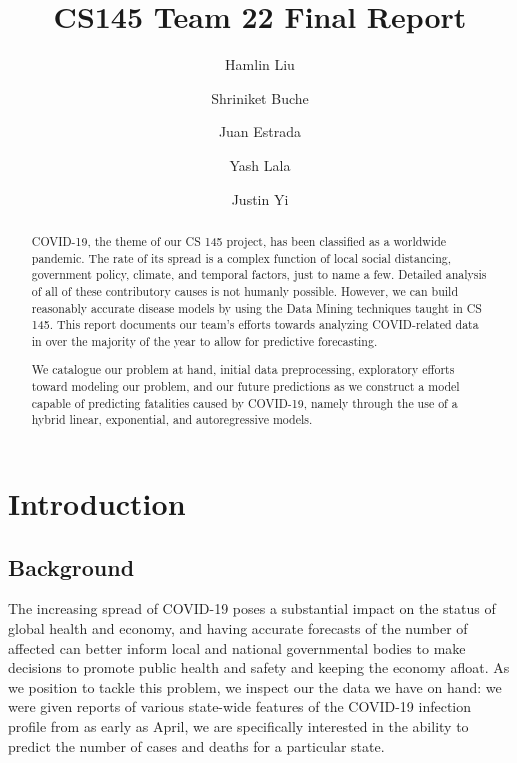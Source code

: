 \documentclass[sigconf,nonacm]{acmart}
\begin{document}
\title{CS145 Team 22 Final Report}

\author{Hamlin Liu}
\author{Shriniket Buche}
\author{Juan Estrada}
\author{Yash Lala}
\author{Justin Yi}
\renewcommand{\shortauthors}{Team 22}

\begin{abstract}

COVID-19, the theme of our CS 145 project, has been classified as a worldwide
pandemic. The rate of its spread is a complex function of local social
distancing, government policy, climate, and temporal factors, just to name a
few. Detailed analysis of all of these contributory causes is not humanly
possible. However, we can build reasonably accurate disease models by using the
Data Mining techniques taught in CS 145. This report documents our team’s
efforts towards analyzing COVID-related data in over the majority of the year
to allow for predictive forecasting. 

We catalogue our problem at hand, initial data preprocessing, exploratory
efforts toward modeling our problem, and our future predictions as we construct
a model capable of predicting fatalities caused by COVID-19, namely through the
use of a hybrid linear, exponential, and autoregressive models. 

\end{abstract}

\maketitle

\section{Introduction}

\subsection{Background}

The increasing spread of COVID-19 poses a substantial impact on the status of
global health and economy, and having accurate forecasts of the number of
affected can better inform local and national governmental bodies to make
decisions to promote public health and safety and keeping the economy afloat.
As we position to tackle this problem, we inspect our the data we have on hand:
we were given reports of various state-wide features of the COVID-19 infection
profile from as early as April, we are specifically interested in the ability
to predict the number of cases and deaths for a particular state.
\end{document}
